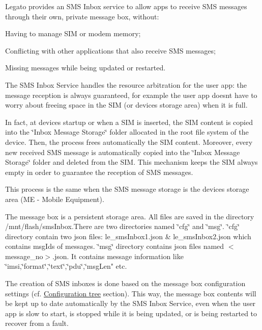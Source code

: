 Legato provides an S\+MS Inbox service to allow apps to receive S\+MS messages through their own, private message box, without\+:


\begin{DoxyItemize}
\item Having to manage S\+IM or modem memory;
\item Conflicting with other applications that also receive S\+MS messages;
\item Missing messages while being updated or restarted.
\end{DoxyItemize}

The S\+MS Inbox Service handles the resource arbitration for the user app\+: the message reception is always guaranteed, for example the user app doesn\textquotesingle{}t have to worry about freeing space in the S\+IM (or device\textquotesingle{}s storage area) when it is full.

In fact, at device\textquotesingle{}s startup or when a S\+IM is inserted, the S\+IM content is copied into the \char`\"{}\+Inbox
   Message Storage\char`\"{} folder allocated in the root file system of the device. Then, the process frees automatically the S\+IM content. Moreover, every new received S\+MS message is automatically copied into the \char`\"{}\+Inbox
   Message Storage\char`\"{} folder and deleted from the S\+IM. This mechanism keeps the S\+IM always empty in order to guarantee the reception of S\+MS messages.

This process is the same when the S\+MS message storage is the device\textquotesingle{}s storage area (ME -\/ Mobile Equipment).

The message box is a persistent storage area. All files are saved in the directory /mnt/flash/sms\+Inbox.There are two directories named \char`\"{}cfg\char`\"{} and \char`\"{}msg\char`\"{}. \char`\"{}cfg\char`\"{} directory contain two json files\+: le\+\_\+sms\+Inbox1.\+json \& le\+\_\+sms\+Inbox2.\+json which contains msg\+Ids of messages. \char`\"{}msg\char`\"{} directory contains json files named $<$message\+\_\+no$>$.json. It contains message information like \char`\"{}imsi,\char`\"{}format\char`\"{},\char`\"{}text\char`\"{},\char`\"{}pdu\char`\"{},\char`\"{}msg\+Len" etc.

The creation of S\+MS inboxes is done based on the message box configuration settings (cf. \hyperlink{c_smsInbox_le_smsInbox_configdb}{Configuration tree} section). This way, the message box contents will be kept up to date automatically by the S\+MS Inbox Service, even when the user app is slow to start, is stopped while it is being updated, or is being restarted to recover from a fault.

